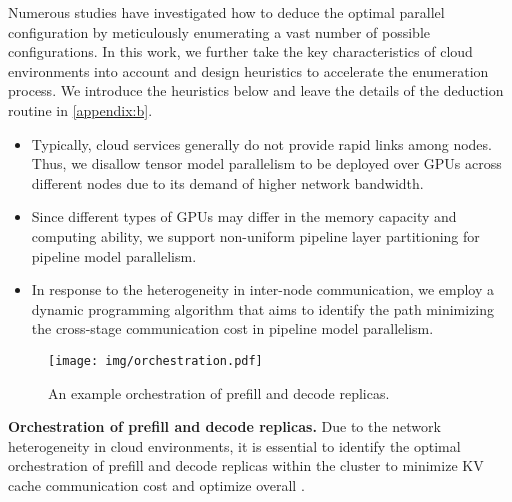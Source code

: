 Numerous studies \cite{jiang2024hexgen,zheng2022alpa,li2023alpaserve,Miao_2022,miao2023spotserve,wang2024improving} have investigated how to deduce the optimal parallel configuration by meticulously enumerating a vast number of possible configurations. In this work, we further take the key characteristics of cloud environments into account and design heuristics to accelerate the enumeration process. We introduce the heuristics below and leave the details of the deduction routine in \autoref{appendix:b}. 

\begin{itemize}[topsep=5pt, leftmargin=*]
     
    \item Typically, cloud services generally do not provide rapid links among nodes. Thus, we disallow tensor model parallelism to be deployed over GPUs across different nodes due to its demand of higher network bandwidth. 

    \item Since different types of GPUs may differ in the memory capacity and computing ability, we support non-uniform pipeline layer partitioning for pipeline model parallelism. 

    \item In response to the heterogeneity in inter-node communication, we employ a dynamic programming algorithm that aims to identify the path minimizing the cross-stage communication cost in pipeline model parallelism.

\end{itemize}

\begin{figure}[!t] 
  \centering
  \texttt{[image: img/orchestration.pdf]} %
  \caption{\small{An example orchestration of prefill and decode replicas.}}
  \label{fig:orches}
  \vspace{-1em}
\end{figure}



\noindent \textbf{Orchestration of prefill and decode replicas.}
Due to the network heterogeneity in cloud environments, it is essential to identify the optimal orchestration of prefill and decode replicas within the cluster to minimize KV cache communication cost and optimize overall .

